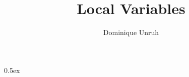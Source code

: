 \documentclass[11pt,a4paper]{article}
\begin{document}
\title{Local Variables}
\author{Dominique Unruh}
\maketitle

\tableofcontents

\parindent 0pt\parskip 0.5ex



%
%
\end{document}
